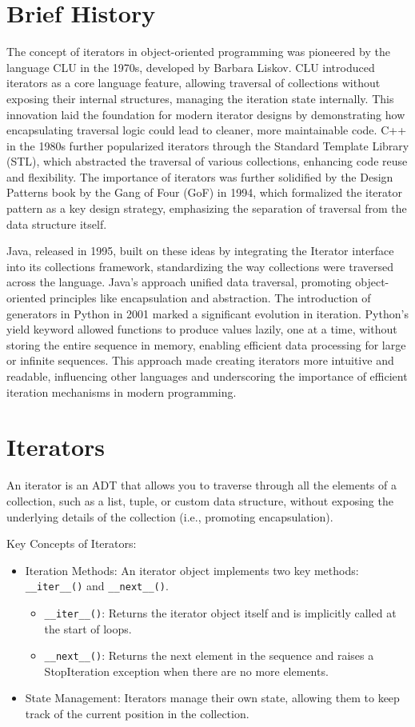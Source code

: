 \documentclass[oneside,11pt,dvipsnames]{book}
\newcommand{\code}[1]{\texttt{#1}}
\begin{document}
\section{Brief History}
The concept of iterators in object-oriented programming was pioneered by the language CLU in the 1970s, developed by Barbara Liskov. CLU introduced iterators as a core language feature, allowing traversal of collections without exposing their internal structures, managing the iteration state internally. This innovation laid the foundation for modern iterator designs by demonstrating how encapsulating traversal logic could lead to cleaner, more maintainable code. C++ in the 1980s further popularized iterators through the Standard Template Library (STL), which abstracted the traversal of various collections, enhancing code reuse and flexibility. The importance of iterators was further solidified by the Design Patterns book by the Gang of Four (GoF) in 1994, which formalized the iterator pattern as a key design strategy, emphasizing the separation of traversal from the data structure itself.

Java, released in 1995, built on these ideas by integrating the Iterator interface into its collections framework, standardizing the way collections were traversed across the language. Java’s approach unified data traversal, promoting object-oriented principles like encapsulation and abstraction. The introduction of generators in Python in 2001 marked a significant evolution in iteration. Python’s yield keyword allowed functions to produce values lazily, one at a time, without storing the entire sequence in memory, enabling efficient data processing for large or infinite sequences. This approach made creating iterators more intuitive and readable, influencing other languages and underscoring the importance of efficient iteration mechanisms in modern programming.

\section{Iterators}

An iterator is an ADT that allows you to traverse through all the elements of a collection, such as a list, tuple, or custom data structure, without exposing the underlying details of the collection (i.e., promoting encapsulation). 

Key Concepts of Iterators:
\begin{itemize}
\item Iteration Methods: An iterator object implements two key methods: \code{\_\_iter\_\_()} and \code{\_\_next\_\_()}.
\begin{itemize}
    \item \code{\_\_iter\_\_()}: Returns the iterator object itself and is implicitly called at the start of loops.
	\item \code{\_\_next\_\_()}: Returns the next element in the sequence and raises a StopIteration exception when there are no more elements.
\end{itemize}
\item State Management: Iterators manage their own state, allowing them to keep track of the current position in the collection.
\end{itemize}
\end{document}
